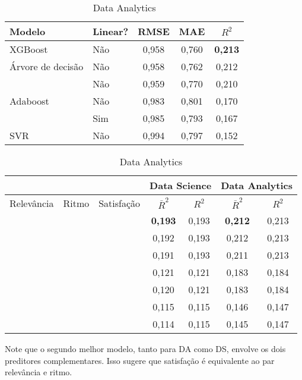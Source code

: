 \begin{table}
	\centering
	\caption{Data Analytics}
	\label{tab:reg-da-1}
	\begin{tabular}{llccc}
		\toprule
		Modelo                  & Linear? & RMSE  &   MAE & $R^2$\\
		\midrule
		XGBoost                 & Não     & 0,958 & 0,760 & \textbf{0,213}\\
		Árvore de decisão       & Não     & 0,958 & 0,762 & 0,212\\
		\foreign{Random Forest} & Não     & 0,959 & 0,770 & 0,210\\
		Adaboost                & Não     & 0,983 & 0,801 & 0,170\\
		\foreign{ElasticNet}    & Sim     & 0,985 & 0,793 & 0,167\\
		SVR                     & Não     & 0,994 & 0,797 & 0,152\\
		\bottomrule
	\end{tabular}
\end{table}

\begin{table}
	\centering
	\caption{Data Analytics}
	\label{tab:reg-da-2}
	\begin{tabular}{ccccccc}
		\toprule
		           &            &            & \multicolumn{2}{c}{Data Science} & \multicolumn{2}{c}{Data Analytics}\\
		\midrule
		Relevância & Ritmo      & Satisfação & $\bar R^2$     & $R^2$ & $\bar R^2$     & $R^2$\\
		\midrule
		           &            & \checkmark & \textbf{0,193} & 0,193 & \textbf{0,212} & 0,213\\
		\checkmark & \checkmark &            & 0,192          & 0,193 & 0,212          & 0,213\\
		\checkmark & \checkmark & \checkmark & 0,191          & 0,193 & 0,211          & 0,213\\
		           & \checkmark &            & 0,121          & 0,121 & 0,183          & 0,184\\
		           & \checkmark & \checkmark & 0,120          & 0,121 & 0,183          & 0,184\\
		\checkmark &            &            & 0,115          & 0,115 & 0,146          & 0,147\\
		\checkmark &            & \checkmark & 0,114          & 0,115 & 0,145          & 0,147\\
		\bottomrule
	\end{tabular}
\end{table}

Note que o segundo melhor modelo, tanto para DA como DS, envolve os dois preditores complementares.
Isso sugere que satisfação é equivalente ao par relevância e ritmo.